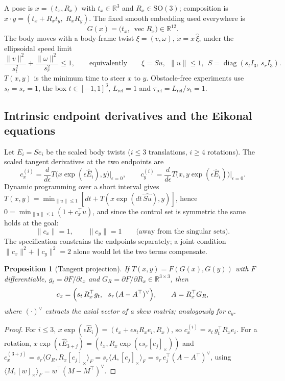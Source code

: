 \documentclass[11pt]{article}
\newtheorem{proposition}{Proposition}
\newcommand{\R}{\mathbb{R}}
\newcommand{\SO}{\mathrm{SO}(3)}
\newcommand{\vecop}{\operatorname{vec}}
\newcommand{\vv}{^{\vee}}
\newcommand{\taur}{\tau_{\mathrm{ref}}}
\begin{document}
A pose is $x=(t_x,R_x)$ with $t_x\in\R^3$ and $R_x\in\SO$; composition is
$x\cdot y=(t_x+R_xt_y,\;R_xR_y)$. The fixed smooth embedding used everywhere is
\begin{equation}
G(x)=\bigl(t_x,\ \vecop R_x\bigr)\in\R^{12}.
\end{equation}
The body moves with a body-frame twist $\xi=(v,\omega)$, $\dot x=x\,\hat\xi$, under the ellipsoidal speed
limit
\begin{equation}
\frac{\|v\|^2}{s_t^2}+\frac{\|\omega\|^2}{s_r^2}\le 1,
\qquad\text{equivalently}\qquad \xi=Su,\ \ \|u\|\le 1,\ \ S=\operatorname{diag}(s_tI_3,\,s_rI_3).
\end{equation}
$T(x,y)$ is the minimum time to steer $x$ to $y$. Obstacle-free experiments use $s_t=s_r=1$, the box
$t\in[-1,1]^3$, $L_{\mathrm{ref}}=1$ and $\taur=L_{\mathrm{ref}}/s_t=1$.

\subsection{Intrinsic endpoint derivatives and the Eikonal equations}

Let $E_i=Se_i$ be the scaled body twists ($i\le 3$ translations, $i\ge4$ rotations). The scaled
tangent derivatives at the two endpoints are
\begin{equation}
c_x^{(i)}=\frac{d}{d\epsilon}T\bigl(x\exp(\epsilon\hat E_i),y\bigr)\Big|_{\epsilon=0},\qquad
c_y^{(i)}=\frac{d}{d\epsilon}T\bigl(x,y\exp(\epsilon\hat E_i)\bigr)\Big|_{\epsilon=0}.
\end{equation}
Dynamic programming over a short interval gives $T(x,y)=\min_{\|u\|\le1}[dt+T(x\exp(dt\,\widehat{Su}),y)]$,
hence $0=\min_{\|u\|\le1}(1+c_x^\top u)$, and since the control set is symmetric the same holds at
the goal:
\begin{equation}
\|c_x\|=1,\qquad \|c_y\|=1\qquad\text{(away from the singular sets).}
\label{eq:eikonal}
\end{equation}
The specification constrains the endpoints separately; a joint condition $\|c_x\|^2+\|c_y\|^2=2$
alone would let the two terms compensate.

\begin{proposition}[Tangent projection]\label{prop:proj}
If $T(x,y)=F(G(x),G(y))$ with $F$ differentiable, $g_t=\partial F/\partial t_x$ and
$G_R=\partial F/\partial R_x\in\R^{3\times3}$, then
\begin{equation}
c_x=\Bigl(s_t\,R_x^\top g_t,\ \ s_r\,(A-A^\top)\vv\Bigr),\qquad A=R_x^\top G_R ,
\label{eq:proj}
\end{equation}
where $(\cdot)\vv$ extracts the axial vector of a skew matrix; analogously for $c_y$.
\end{proposition}
\begin{proof}
For $i\le3$, $x\exp(\epsilon\hat E_i)=(t_x+\epsilon s_tR_xe_i,R_x)$, so $c_x^{(i)}=s_t\,g_t^\top R_xe_i$.
For a rotation, $x\exp(\epsilon\hat E_{3+j})=(t_x,R_x\exp(\epsilon s_r[e_j]_\times))$ and
$c_x^{(3+j)}=s_r\langle G_R,R_x[e_j]_\times\rangle_F=s_r\langle A,[e_j]_\times\rangle_F
=s_r\,e_j^\top(A-A^\top)\vv$, using $\langle M,[w]_\times\rangle_F=w^\top(M-M^\top)\vv$.
\end{proof}
\end{document}
